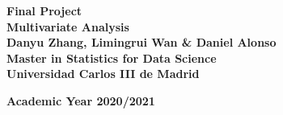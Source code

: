 \documentclass[a4paper,12pt]{article}
\begin{document}
	
		\begin{titlepage}
		\begin{center}
		\textbf{\LARGE Final Project}\\[0.5 cm]
		\textbf{\LARGE Multivariate Analysis}\\[5 cm]
		
        \textbf{\large Danyu Zhang, Limingrui Wan \& Daniel Alonso}\\[0.1cm]
        \textbf{\large Master in Statistics for Data Science}\\[0.1 cm]
        \textbf{\large Universidad Carlos III de Madrid}\\[1 cm]
        \begin{figure}[H]
		    \centering
		\end{figure}
		\textbf{Academic Year 2020/2021}    
		\end{center}
	    \end{titlepage} 
\end{document}

